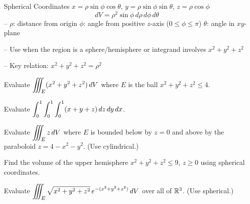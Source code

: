 \documentclass[11pt]{article}
\begin{document}

\begin{formulabox}{Spherical Coordinates}
$x = \rho\sin\phi\cos\theta$, \quad $y = \rho\sin\phi\sin\theta$, \quad $z = \rho\cos\phi$
\[dV = \rho^2\sin\phi\,d\rho\,d\phi\,d\theta\]
-- $\rho$: distance from origin \quad $\phi$: angle from positive $z$-axis ($0 \le \phi \le \pi$) \quad $\theta$: angle in $xy$-plane

-- Use when the region is a sphere/hemisphere or integrand involves $x^2+y^2+z^2$

-- Key relation: $x^2+y^2+z^2 = \rho^2$
\end{formulabox}

\begin{example}
Evaluate $\displaystyle\iiint_E (x^2+y^2+z^2)\,dV$ where $E$ is the ball $x^2+y^2+z^2 \le 4$.

\end{example}


\begin{practice}

\prob Evaluate $\displaystyle\int_0^1\int_0^1\int_0^1 (x+y+z)\,dz\,dy\,dx$.


\vspace{3.5cm}

\prob Evaluate $\displaystyle\iiint_E z\,dV$ where $E$ is bounded below by $z = 0$ and above by the paraboloid $z = 4-x^2-y^2$. (Use cylindrical.)


\vspace{5cm}

\prob Find the volume of the upper hemisphere $x^2+y^2+z^2 \le 9$, $z \ge 0$ using spherical coordinates.

\wans{\wbm{$18\pi$}}

\vspace{4.5cm}

\prob Evaluate $\displaystyle\iiint_E \sqrt{x^2+y^2+z^2}\,e^{-(x^2+y^2+z^2)}\,dV$ over all of $\mathbb{R}^3$. (Use spherical.)

\wans{\wbm{$2\pi$}}

\vspace{5cm}

\end{practice}
\end{document}
